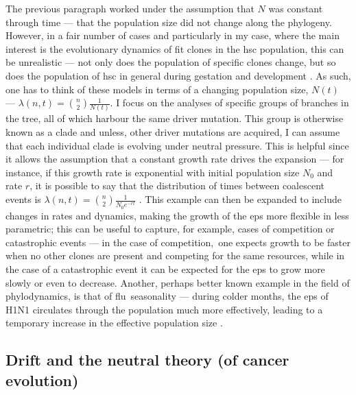The previous paragraph worked under the assumption that $N$ was constant through time --- that the population size did not change along the phylogeny. However, in a fair number of cases and particularly in my case, where the main interest is the evolutionary dynamics of fit clones in the \ac{hsc} population, this can be unrealistic --- not only does the population of specific clones change, but so does the population of \ac{hsc} in general during gestation and development \cite{Lee-Six2018-lp}. As such, one has to think of these models in terms of a changing population size, $N(t)$ --- $\lambda(n,t) = \binom{n}{2}\frac{1}{N(t)}$. I focus on the analyses of specific groups of branches in the tree, all of which harbour the same driver mutation. This group is otherwise known as a clade and unless, other driver mutations are acquired, I can assume that each individual clade is evolving under neutral pressure. This is helpful since it allows the assumption that a constant growth rate drives the expansion --- for instance, if this growth rate is exponential with initial population size $N_0$ and rate $r$, it is possible to say that the distribution of times between coalescent events is $\lambda(n,t) = \binom{n}{2}\frac{1}{N_0 e^{-rt}}$ \cite{Volz2013-ey}. This example can then be expanded to include changes in rates and dynamics, making the growth of the \ac{eps} more flexible in less parametric; this can be useful to capture, for example, cases of competition or catastrophic events --- in the case of competition, one expects growth to be faster when no other clones are present and competing for the same resources, while in the case of a catastrophic event it can be expected for the \ac{eps} to grow more slowly or even to decrease. Another, perhaps better known example in the field of phylodynamics, is that of flu seasonality --- during colder months, the \ac{eps} of H1N1 circulates through the population much more effectively, leading to a temporary increase in the effective population size \cite{Karcher2020-bg}.

\subsection{Drift and the neutral theory (of cancer evolution)}

